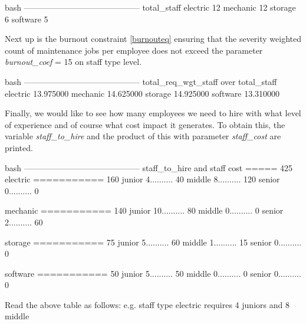         \begin{boxminted}{bash}
            ------------------------------------------
            total_staff
            electric 12
            mechanic 12
            storage 6
            software 5
        \end{boxminted}
        \newline
        Next up is the burnout constraint \eqref{burnouteq} ensuring that the severity weighted count of maintenance jobs
        per employee does not exceed the parameter \textit{burnout\_coef} = 15 on staff type level.
        \bigskip
        \newline
        \vspace{2pt}
        \begin{boxminted}{bash}
            ------------------------------------------
            total_req_wgt_staff over total_staff
            electric 13.975000
            mechanic 14.625000
            storage  14.925000
            software 13.310000
        \end{boxminted}
        \newline
        Finally, we would like to see how many employees we need to hire with what level of experience
        and of course what cost impact it generates. To obtain this, the variable 
        \textit{staff\_to\_hire} and the product of this with parameter \textit{staff\_cost} are 
        printed.
        \newline
        \vspace{2pt}
        \begin{boxminted}{bash}
            ------------------------------------------
            staff_to_hire and staff cost ===== 425
            electric   =========== 160
            junior     4.......... 40
            middle     8.......... 120
            senior     0.......... 0

            mechanic   =========== 140
            junior     10.......... 80
            middle     0.......... 0
            senior     2.......... 60

            storage   =========== 75
            junior     5.......... 60
            middle     1.......... 15
            senior     0.......... 0

            software   =========== 50
            junior     5.......... 50
            middle     0.......... 0
            senior     0.......... 0
        \end{boxminted}
        \newline
        Read the above table as follows: e.g. staff type electric requires 4 juniors and 8 middle
